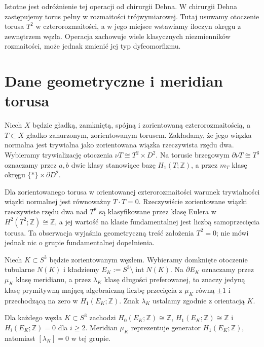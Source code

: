 Istotne jest odróżnienie tej operacji od chirurgii Dehna.
W chirurgii Dehna zastępujemy torus pełny w rozmaitości
trójwymiarowej. Tutaj usuwamy otoczenie torusa $T^2$ w
czterorozmaitości, a w jego miejsce wstawiamy iloczyn okręgu
z zewnętrzem węzła. Operacja zachowuje wiele klasycznych
niezmienników rozmaitości, może jednak zmienić jej typ
dyfeomorfizmu.

\section{Dane geometryczne i meridian torusa}
\label{sec:tg-ks-data}

\begin{definicja}
Niech $X$ będzie gładką, zamkniętą, spójną i zorientowaną
czterorozmaitością, a $T\subset X$ gładko zanurzonym,
zorientowanym torusem. Zakładamy, że jego wiązka normalna
jest trywialna jako zorientowana wiązka rzeczywista
rzędu dwa. Wybieramy trywializację otoczenia
$\nu T\cong T^2\times D^2$. Na torusie brzegowym
$\partial\nu T\cong T^3$ oznaczamy przez $a,b$ dwie
klasy stanowiące bazę $H_1(T;\mathbb Z)$, a przez
$m_T$ klasę okręgu $\{*\}\times\partial D^2$.
\end{definicja}

Dla zorientowanego torusa w orientowanej czterorozmaitości
warunek trywialności wiązki normalnej jest równoważny
$T\cdot T=0$. Rzeczywiście zorientowane wiązki
rzeczywiste rzędu dwa nad $T^2$ są klasyfikowane
przez klasę Eulera w $H^2(T^2;\mathbb Z)\cong\mathbb Z$,
a jej wartość na klasie fundamentalnej jest
liczbą samoprzecięcia torusa. Ta obserwacja
wyjaśnia geometryczną treść założenia $T^2=0$;
nie mówi jednak nic o grupie fundamentalnej dopełnienia.

\begin{definicja}
Niech $K\subset S^3$ będzie zorientowanym węzłem.
Wybieramy domknięte otoczenie tubularne $N(K)$ i kładziemy
$E_K:=S^3\setminus\operatorname{int}N(K)$.
Na $\partial E_K$ oznaczamy przez $\mu_K$ klasę
meridianu, a przez $\lambda_K$ klasę długości
preferowanej, to znaczy jedyną klasę prymitywną
mającą algebraiczną liczbę przecięcia z $\mu_K$
równą $\pm1$ i przechodzącą na zero w
$H_1(E_K;\mathbb Z)$. Znak $\lambda_K$ ustalamy
zgodnie z orientacją $K$.
\end{definicja}

\begin{lemat}
\label{lem:tg-ks-exterior}
Dla każdego węzła $K\subset S^3$ zachodzi
$H_0(E_K;\mathbb Z)\cong\mathbb Z$,
$H_1(E_K;\mathbb Z)\cong\mathbb Z$ i
$H_i(E_K;\mathbb Z)=0$ dla $i\ge2$.
Meridian $\mu_K$ reprezentuje generator $H_1(E_K;\mathbb Z)$,
natomiast $[\lambda_K]=0$ w tej grupie.
\end{lemat}

